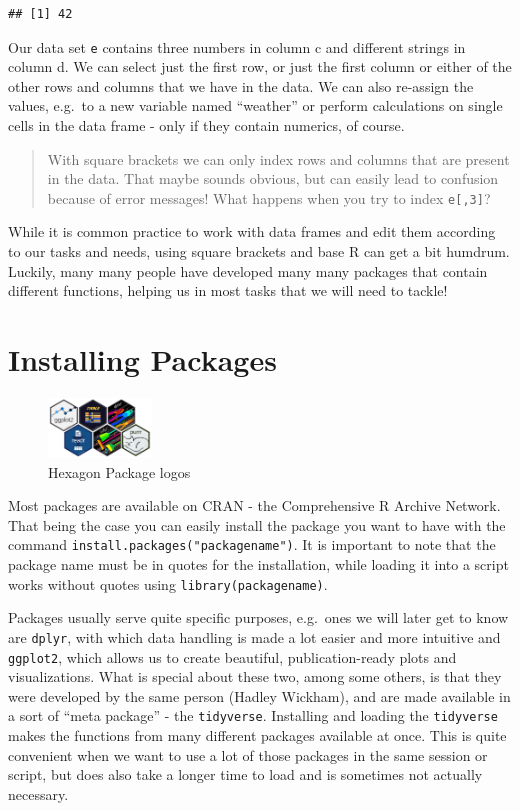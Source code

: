 \documentclass[
]{book}
\begin{document}
\begin{verbatim}
## [1] 42
\end{verbatim}

Our data set \texttt{e} contains three numbers in column c and different strings in column d.
We can select just the first row, or just the first column or either of the other rows and columns that we have in the data.
We can also re-assign the values, e.g.~to a new variable named ``weather'' or perform calculations on single cells in the data frame - only if they contain numerics, of course.

\begin{quote}
With square brackets we can only index rows and columns that are present in the data.
That maybe sounds obvious, but can easily lead to confusion because of error messages!
What happens when you try to index \texttt{e{[},3{]}}?
\end{quote}

While it is common practice to work with data frames and edit them according to our tasks and needs, using square brackets and base R can get a bit humdrum.
Luckily, many many people have developed many many packages that contain different functions, helping us in most tasks that we will need to tackle!

\section{Installing Packages}\label{installing-packages}

\begin{figure}
\centering
\includegraphics[width=\textwidth,height=0.625in]{./img/hexagons.png}
\caption{Hexagon Package logos}\label{id}
\end{figure}

Most packages are available on CRAN - the Comprehensive R Archive Network.
That being the case you can easily install the package you want to have with the command \texttt{install.packages("packagename")}.
It is important to note that the package name must be in quotes for the installation, while loading it into a script works without quotes using \texttt{library(packagename)}.

Packages usually serve quite specific purposes, e.g.~ones we will later get to know are \texttt{dplyr}, with which data handling is made a lot easier and more intuitive and \texttt{ggplot2}, which allows us to create beautiful, publication-ready plots and visualizations.
What is special about these two, among some others, is that they were developed by the same person (Hadley Wickham), and are made available in a sort of ``meta package'' - the \texttt{tidyverse}.
Installing and loading the \texttt{tidyverse} makes the functions from many different packages available at once.
This is quite convenient when we want to use a lot of those packages in the same session or script, but does also take a longer time to load and is sometimes not actually necessary.
\end{document}
